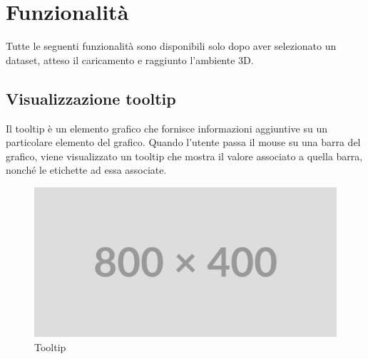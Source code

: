 \section{Funzionalità}
Tutte le seguenti funzionalità sono disponibili solo dopo aver selezionato un
dataset, atteso il caricamento e raggiunto l'ambiente 3D.

\subsection{Visualizzazione tooltip}
Il tooltip è un elemento grafico che fornisce informazioni aggiuntive su un
particolare elemento del grafico. Quando l'utente passa il mouse su una barra
del grafico, viene visualizzato un tooltip che mostra il valore associato a
quella barra, nonché le etichette ad essa associate.
\begin{figure}[h!]
    \centering
    \includegraphics[scale=0.6]{template/images/placeholder.png}
    \caption{Tooltip}
\end{figure}

